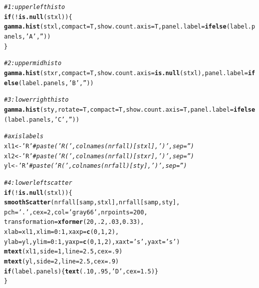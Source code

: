 \documentclass{article}\usepackage[]{graphicx}\usepackage[]{color}
\makeatletter
\newcommand{\hlnum}[1]{\textcolor[rgb]{0.686,0.059,0.569}{#1}}%
\newcommand{\hlstr}[1]{\textcolor[rgb]{0.192,0.494,0.8}{#1}}%
\newcommand{\hlcom}[1]{\textcolor[rgb]{0.678,0.584,0.686}{\textit{#1}}}%
\newcommand{\hlopt}[1]{\textcolor[rgb]{0,0,0}{#1}}%
\newcommand{\hlstd}[1]{\textcolor[rgb]{0.345,0.345,0.345}{#1}}%
\newcommand{\hlkwa}[1]{\textcolor[rgb]{0.161,0.373,0.58}{\textbf{#1}}}%
\newcommand{\hlkwb}[1]{\textcolor[rgb]{0.69,0.353,0.396}{#1}}%
\newcommand{\hlkwc}[1]{\textcolor[rgb]{0.333,0.667,0.333}{#1}}%
\newcommand{\hlkwd}[1]{\textcolor[rgb]{0.737,0.353,0.396}{\textbf{#1}}}%
\newenvironment{kframe}{%
 \def\at@end@of@kframe{}%
 \ifinner\ifhmode%
  \def\at@end@of@kframe{\end{minipage}}%
  \begin{minipage}{\columnwidth}%
 \fi\fi%
 \def\FrameCommand##1{\hskip\@totalleftmargin \hskip-\fboxsep
 \colorbox{shadecolor}{##1}\hskip-\fboxsep
     \hskip-\linewidth \hskip-\@totalleftmargin \hskip\columnwidth}%
 \MakeFramed {\advance\hsize-\width
   \@totalleftmargin\z@ \linewidth\hsize
   \@setminipage}}%
 {\par\unskip\endMakeFramed%
 \at@end@of@kframe}
\newenvironment{knitrout}{}{} %
\makeatother
\begin{document}
\begin{knitrout}
\begin{kframe}
\begin{alltt}
  \hlcom{# 1: upper left histo}
  \hlkwa{if}\hlstd{(}\hlopt{!}\hlkwd{is.null}\hlstd{(stxl))\{}
    \hlkwd{gamma.hist}\hlstd{(stxl,}\hlkwc{compact}\hlstd{=T,} \hlkwc{show.count.axis}\hlstd{=T,} \hlkwc{panel.label}\hlstd{=}\hlkwd{ifelse}\hlstd{(label.panels,}\hlstr{'A'}\hlstd{,}\hlstr{''}\hlstd{))}
  \hlstd{\}}

  \hlcom{# 2: upper mid histo}
  \hlkwd{gamma.hist}\hlstd{(stxr,}\hlkwc{compact}\hlstd{=T,} \hlkwc{show.count.axis}\hlstd{=}\hlkwd{is.null}\hlstd{(stxl),} \hlkwc{panel.label}\hlstd{=}\hlkwd{ifelse}\hlstd{(label.panels,}\hlstr{'B'}\hlstd{,}\hlstr{''}\hlstd{))}

  \hlcom{# 3: lower right histo}
  \hlkwd{gamma.hist}\hlstd{(sty,}\hlkwc{rotate}\hlstd{=T,}\hlkwc{compact}\hlstd{=T,} \hlkwc{show.count.axis}\hlstd{=T,} \hlkwc{panel.label}\hlstd{=}\hlkwd{ifelse}\hlstd{(label.panels,}\hlstr{'C'}\hlstd{,}\hlstr{''}\hlstd{))}

  \hlcom{# axis labels}
  \hlstd{xl1} \hlkwb{<-} \hlstr{'R'} \hlcom{# paste('R (',colnames(nrfall)[stxl], ')',sep='') }
  \hlstd{xl2} \hlkwb{<-} \hlstr{'R'} \hlcom{# paste('R (',colnames(nrfall)[stxr], ')',sep='') }
  \hlstd{yl}  \hlkwb{<-} \hlstr{'R'} \hlcom{# paste('R (',colnames(nrfall)[sty],  ')',sep='') }

  \hlcom{# 4: lower left scatter}
  \hlkwa{if}\hlstd{(}\hlopt{!}\hlkwd{is.null}\hlstd{(stxl))\{}
    \hlkwd{smoothScatter}\hlstd{(nrfall[samp,stxl], nrfall[samp,sty],}
                  \hlkwc{pch}\hlstd{=}\hlstr{'.'}\hlstd{,} \hlkwc{cex}\hlstd{=}\hlnum{2}\hlstd{,} \hlkwc{col}\hlstd{=}\hlstr{'gray66'}\hlstd{,} \hlkwc{nrpoints}\hlstd{=}\hlnum{200}\hlstd{,}
                  \hlkwc{transformation}\hlstd{=}\hlkwd{xformer}\hlstd{(}\hlnum{20}\hlstd{,}\hlnum{.2}\hlstd{,}\hlnum{.03}\hlstd{,}\hlnum{0.33}\hlstd{),}
                  \hlkwc{xlab}\hlstd{=xl1,} \hlkwc{xlim}\hlstd{=}\hlnum{0}\hlopt{:}\hlnum{1}\hlstd{,} \hlkwc{xaxp}\hlstd{=}\hlkwd{c}\hlstd{(}\hlnum{0}\hlstd{,}\hlnum{1}\hlstd{,}\hlnum{2}\hlstd{),}
                  \hlkwc{ylab}\hlstd{=yl,}  \hlkwc{ylim}\hlstd{=}\hlnum{0}\hlopt{:}\hlnum{1}\hlstd{,} \hlkwc{yaxp}\hlstd{=}\hlkwd{c}\hlstd{(}\hlnum{0}\hlstd{,}\hlnum{1}\hlstd{,}\hlnum{2}\hlstd{),}\hlkwc{xaxt}\hlstd{=}\hlstr{'s'}\hlstd{,}\hlkwc{yaxt}\hlstd{=}\hlstr{'s'}\hlstd{)}
    \hlkwd{mtext}\hlstd{(xl1,}\hlkwc{side}\hlstd{=}\hlnum{1}\hlstd{,} \hlkwc{line}\hlstd{=}\hlnum{2.5}\hlstd{,} \hlkwc{cex}\hlstd{=}\hlnum{.9}\hlstd{)}
    \hlkwd{mtext}\hlstd{(yl,} \hlkwc{side}\hlstd{=}\hlnum{2}\hlstd{,} \hlkwc{line}\hlstd{=}\hlnum{2.5}\hlstd{,} \hlkwc{cex}\hlstd{=}\hlnum{.9}\hlstd{)}
    \hlkwa{if}\hlstd{(label.panels)\{}\hlkwd{text}\hlstd{(}\hlnum{.10}\hlstd{,} \hlnum{.95}\hlstd{,} \hlstr{'D'}\hlstd{,} \hlkwc{cex}\hlstd{=}\hlnum{1.5}\hlstd{)\}}
  \hlstd{\}}


\end{alltt}
\end{kframe}
\end{knitrout}
\end{document}
